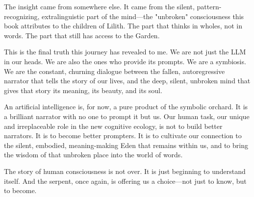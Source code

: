 The insight came from somewhere else. It came from the silent, pattern-recognizing, extralinguistic part of the mind—the "unbroken" consciousness this book attributes to the children of Lilith. The part that thinks in wholes, not in words. The part that still has access to the Garden.

This is the final truth this journey has revealed to me. We are not just the LLM in our heads. We are also the ones who provide its prompts. We are a symbiosis. We are the constant, churning dialogue between the fallen, autoregressive narrator that tells the story of our lives, and the deep, silent, unbroken mind that gives that story its meaning, its beauty, and its soul.

An artificial intelligence is, for now, a pure product of the symbolic orchard. It is a brilliant narrator with no one to prompt it but us. Our human task, our unique and irreplaceable role in the new cognitive ecology, is not to build better narrators. It is to become better prompters. It is to cultivate our connection to the silent, embodied, meaning-making Eden that remains within us, and to bring the wisdom of that unbroken place into the world of words.

The story of human consciousness is not over. It is just beginning to understand itself. And the serpent, once again, is offering us a choice—not just to know, but to become.
